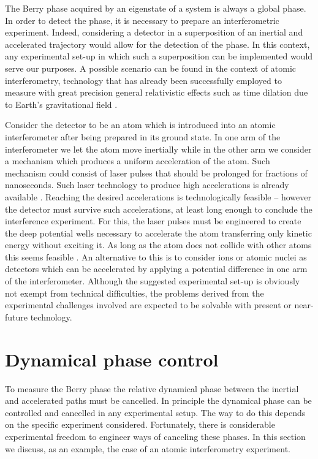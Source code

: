 The Berry phase acquired by an eigenstate of a system is always a global phase. In order to detect the phase, it is necessary to prepare an interferometric experiment. Indeed, considering a detector in a superposition of an inertial and accelerated trajectory would allow for the detection of the phase. In this context, any experimental set-up in which such a superposition can be implemented would serve our purposes. A possible scenario can be found in the context of atomic interferometry, technology that has already been successfully employed to measure with great precision general relativistic effects such as time dilation due to Earth's gravitational field \cite{atomGR}.

Consider the detector to be an atom which is introduced into an atomic interferometer after being prepared in its ground state. In one arm of the interferometer we let the atom move inertially while in the other arm we consider a mechanism  which produces a uniform acceleration of the atom. Such mechanism could consist of laser pulses that should be prolonged for fractions of nanoseconds.  Such laser technology to produce high accelerations is already available \cite{laser}.  Reaching the desired accelerations is technologically feasible -- however  the detector must survive such accelerations, at least long enough to conclude the interference experiment. For this, the laser pulses must be engineered to create the deep potential wells necessary to accelerate the atom transferring only kinetic energy without exciting it.  As long as the atom does not collide with other atoms this seems feasible \cite{ruso}.  An alternative to this is to consider ions or atomic nuclei as detectors which can be accelerated by applying a potential difference in one arm of the interferometer.  Although the suggested experimental set-up is obviously not exempt from technical difficulties, the problems derived from the experimental challenges involved are expected to be solvable with  present or near-future technology.  


\section{Dynamical phase control}

To measure the Berry phase the relative dynamical phase between the inertial and accelerated paths must be cancelled. In principle the dynamical phase can be controlled and cancelled in any experimental setup. The way to do this depends on the specific experiment considered. 
Fortunately, there is considerable experimental freedom to engineer ways of canceling these phases.  In this section we discuss, as an example, the case of an atomic interferometry experiment. 
 

